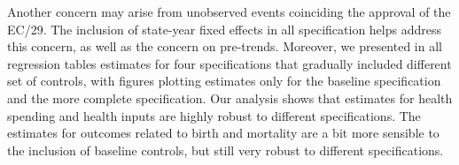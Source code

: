 Another concern may arise from unobserved events coinciding the approval of the EC/29. The inclusion of state-year fixed effects in all specification helps address this concern, as well as the concern on pre-trends. Moreover, we presented in all regression tables estimates for four specifications that gradually included different set of controls, with figures plotting estimates only for the baseline specification and the more complete specification. Our analysis shows that estimates for health spending and health inputs are highly robust to different specifications. The estimates for outcomes related to birth and mortality are a bit more sensible to the inclusion of baseline controls, but still very robust to different specifications.
